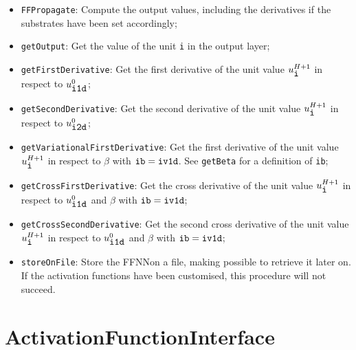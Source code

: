 \documentclass[11pt,a4paper,twoside]{article}
\begin{document}
\begin{itemize}
\item \verb+FFPropagate+: Compute the output values, including the derivatives if the substrates have been set accordingly;
\item \verb+getOutput+: Get the value of the unit \verb+i+ in the output layer;
\item \verb+getFirstDerivative+: Get the first derivative of the unit value $u^{H+1}_{\verb+i+}$ in respect to $u^0_{\verb+i1d+}$;
\item \verb+getSecondDerivative+: Get the second derivative of the unit value $u^{H+1}_{\verb+i+}$ in respect to $u^0_{\verb+i2d+}$;
\item \verb+getVariationalFirstDerivative+: Get the first derivative of the unit value $u^{H+1}_{\verb+i+}$ in respect to $\beta$ with $\verb+ib+ = \verb+iv1d+$. See \verb+getBeta+ for a definition of \verb+ib+;
\item \verb+getCrossFirstDerivative+: Get the cross derivative of the unit value $u^{H+1}_{\verb+i+}$ in respect to $u^0_{\verb+i1d+}$ and $\beta$ with $\verb+ib+ = \verb+iv1d+$;
\item \verb+getCrossSecondDerivative+: Get the second cross derivative of the unit value $u^{H+1}_{\verb+i+}$ in respect to $u^0_{\verb+i1d+}$ and $\beta$ with $\verb+ib+ = \verb+iv1d+$;
\item \verb+storeOnFile+: Store the FFNNon a file, making possible to retrieve it later on. If the activation functions have been customised, this procedure will not succeed.
\end{itemize}


\section{ActivationFunctionInterface} %
\label{sec:activationfunctioninterface}
\end{document}
